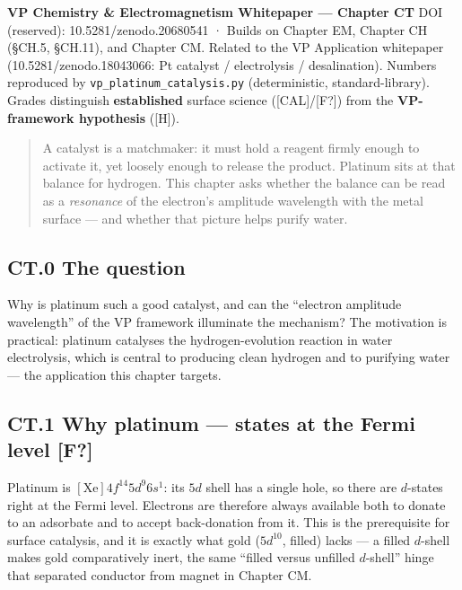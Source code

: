 \documentclass[
  10pt,
]{article}
\begin{document}
\textbf{VP Chemistry \& Electromagnetism Whitepaper --- Chapter CT} DOI
(reserved): 10.5281/zenodo.20680541 · Builds on Chapter EM, Chapter CH
(§CH.5, §CH.11), and Chapter CM. Related to the VP Application
whitepaper (10.5281/zenodo.18043066: Pt catalyst / electrolysis /
desalination). Numbers reproduced by \texttt{vp\_platinum\_catalysis.py}
(deterministic, standard-library). Grades distinguish
\textbf{established} surface science ({[}CAL{]}/{[}F?{]}) from the
\textbf{VP-framework hypothesis} ({[}H{]}).

\begin{quote}
A catalyst is a matchmaker: it must hold a reagent firmly enough to
activate it, yet loosely enough to release the product. Platinum sits at
that balance for hydrogen. This chapter asks whether the balance can be
read as a \emph{resonance} of the electron's amplitude wavelength with
the metal surface --- and whether that picture helps purify water.
\end{quote}

\hypertarget{ct.0-the-question}{%
\subsection{CT.0 The question}\label{ct.0-the-question}}

Why is platinum such a good catalyst, and can the ``electron amplitude
wavelength'' of the VP framework illuminate the mechanism? The
motivation is practical: platinum catalyses the hydrogen-evolution
reaction in water electrolysis, which is central to producing clean
hydrogen and to purifying water --- the application this chapter
targets.

\hypertarget{ct.1-why-platinum-states-at-the-fermi-level-f}{%
\subsection{\texorpdfstring{CT.1 Why platinum --- states at the Fermi
level
\textbf{{[}F?{]}}}{CT.1 Why platinum --- states at the Fermi level {[}F?{]}}}\label{ct.1-why-platinum-states-at-the-fermi-level-f}}

Platinum is \([\mathrm{Xe}]4f^{14}5d^9 6s^1\): its \(5d\) shell has a
single hole, so there are \(d\)-states right at the Fermi level.
Electrons are therefore always available both to donate to an adsorbate
and to accept back-donation from it. This is the prerequisite for
surface catalysis, and it is exactly what gold (\(5d^{10}\), filled)
lacks --- a filled \(d\)-shell makes gold comparatively inert, the same
``filled versus unfilled \(d\)-shell'' hinge that separated conductor
from magnet in Chapter CM.
\end{document}
